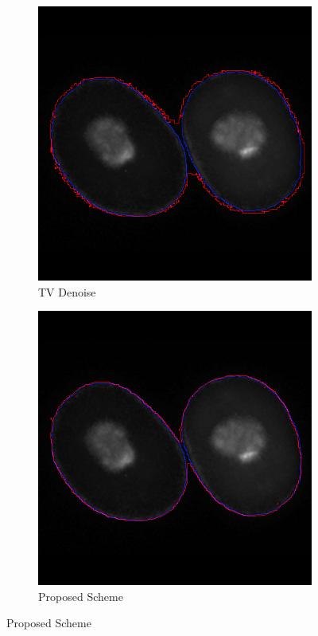 \documentclass[a4paper,11pt]{ijamas}
\begin{document}
{\begin{figure}
\begin{subfigure}{.25\textwidth}
  \includegraphics[width=0.80\columnwidth]{./figs/results/1tv.jpg}
 \caption{TV Denoise}
  \label{fig:tvseg_1}
\end{subfigure}%
\begin{subfigure}{.25\textwidth}
  \centering
  \includegraphics[width=0.80\columnwidth]{./figs/results/1scheme.jpg}
 \caption{Proposed Scheme}
  \label{fig:schemeseg_1}
\end{subfigure}%



\end{figure}}
\end{document}

